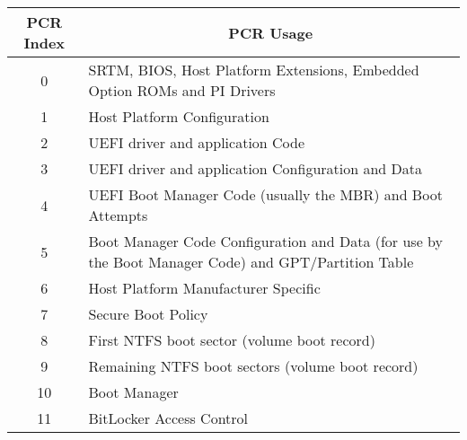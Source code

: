 \begin{table}
    \centering
    \begin{tabular}{ c|p{30em}  }
        \acs{PCR} Index & \multicolumn{1}{c}{\acs{PCR} Usage}                                                                      \\
        \hline
        0               & SRTM, BIOS, Host Platform Extensions, Embedded Option ROMs and PI Drivers                                \\
        \hline
        1               & Host Platform Configuration                                                                              \\
        \hline
        2               & UEFI driver and application Code                                                                         \\
        \hline
        3               & UEFI driver and application Configuration and Data                                                       \\
        \hline
        4               & UEFI Boot Manager Code (usually the MBR) and Boot Attempts                                               \\
        \hline
        5               & Boot Manager Code Configuration and Data (for use by the Boot Manager Code) and \ac{GPT}/Partition Table \\
        \hline
        6               & Host Platform Manufacturer Specific                                                                      \\
        \hline
        7               & Secure Boot Policy                                                                                       \\
        \hline
        8               & First \ac{NTFS} boot sector (volume boot record)                                                         \\
        \hline
        9               & Remaining \ac{NTFS} boot sectors (volume boot record)                                                    \\
        \hline
        10              & Boot Manager                                                                                             \\
        \hline
        11              & BitLocker Access Control                                                                                 \\
    \end{tabular}

    \caption{\cite{tcg-pc-client-platform-firmware-profile-spec, windows-internals-6-part2}}
\end{table}


